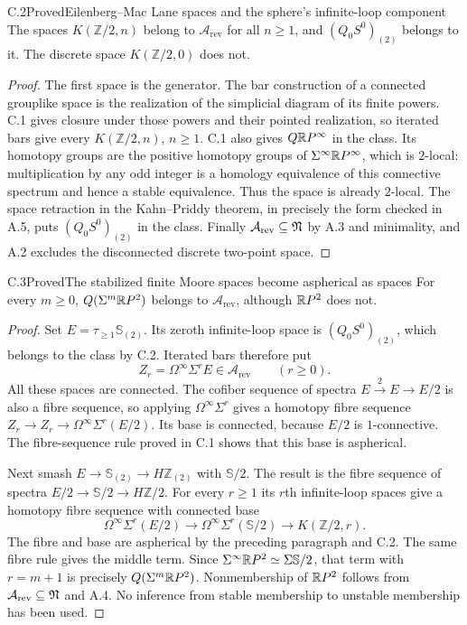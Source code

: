 \begin{claim}{C.2}{Proved}{Eilenberg--Mac Lane spaces and the sphere's infinite-loop component}
The spaces $K(\mathbb Z/2,n)$ belong to $\mathcal A_{\mathrm{rev}}$ for all $n\geq1$, and $(Q_0S^0)_{(2)}$ belongs to it. The discrete space $K(\mathbb Z/2,0)$ does not.
\end{claim}
\begin{proof}
The first space is the generator. The bar construction of a connected grouplike space is the realization of the simplicial diagram of its finite powers. C.1 gives closure under those powers and their pointed realization, so iterated bars give every $K(\mathbb Z/2,n)$, $n\geq1$. C.1 also gives $Q\mathbb{R}P^\infty$ in the class. Its homotopy groups are the positive homotopy groups of $\Sigma^\infty\mathbb{R}P^\infty$, which is $2$-local: multiplication by any odd integer is a homology equivalence of this connective spectrum and hence a stable equivalence. Thus the space is already $2$-local. The space retraction in the Kahn--Priddy theorem, in precisely the form checked in A.5, puts $(Q_0S^0)_{(2)}$ in the class. Finally $\mathcal A_{\mathrm{rev}}\subseteq\mathfrak N$ by A.3 and minimality, and A.2 excludes the disconnected discrete two-point space.
\end{proof}

\begin{claim}{C.3}{Proved}{The stabilized finite Moore spaces become aspherical as spaces}
For every $m\geq0$, $Q(\Sigma^m\mathbb{R}P^2)$ belongs to $\mathcal A_{\mathrm{rev}}$, although $\mathbb{R}P^2$ does not.
\end{claim}
\begin{proof}
Set $E=\tau_{\geq1}\mathbb S_{(2)}$. Its zeroth infinite-loop space is $(Q_0S^0)_{(2)}$, which belongs to the class by C.2. Iterated bars therefore put
\[
 Z_r=\Omega^\infty\Sigma^rE\in\mathcal A_{\mathrm{rev}}
 \qquad(r\geq0).
\]
All these spaces are connected. The cofiber sequence of spectra $E\xrightarrow{2}E\to E/2$ is also a fibre sequence, so applying $\Omega^\infty\Sigma^r$ gives a homotopy fibre sequence $Z_r\to Z_r\to\Omega^\infty\Sigma^r(E/2)$. Its base is connected, because $E/2$ is $1$-connective. The fibre-sequence rule proved in C.1 shows that this base is aspherical.

Next smash $E\to\mathbb S_{(2)}\to H\mathbb Z_{(2)}$ with $\mathbb S/2$. The result is the fibre sequence of spectra $E/2\to\mathbb S/2\to H\mathbb Z/2$. For every $r\geq1$ its $r$th infinite-loop spaces give a homotopy fibre sequence with connected base
\[
 \Omega^\infty\Sigma^r(E/2)\longrightarrow
 \Omega^\infty\Sigma^r(\mathbb S/2)\longrightarrow
 K(\mathbb Z/2,r).
\]
The fibre and base are aspherical by the preceding paragraph and C.2. The same fibre rule gives the middle term. Since $\Sigma^\infty\mathbb{R}P^2\simeq\Sigma\mathbb S/2$, that term with $r=m+1$ is precisely $Q(\Sigma^m\mathbb{R}P^2)$. Nonmembership of $\mathbb{R}P^2$ follows from $\mathcal A_{\mathrm{rev}}\subseteq\mathfrak N$ and A.4. No inference from stable membership to unstable membership has been used.
\end{proof}

